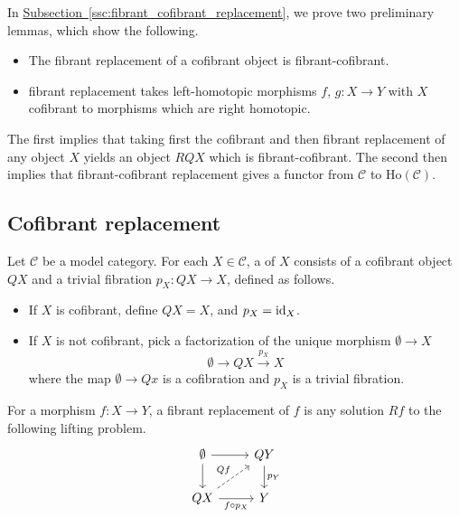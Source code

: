 \documentclass[main.tex]{subfiles}
\begin{document}
In \hyperref[ssc:fibrant_cofibrant_replacement]{Subsection~\ref*{ssc:fibrant_cofibrant_replacement}}, we prove two preliminary lemmas, which show the following.
\begin{itemize}
  \item The fibrant replacement of a cofibrant object is fibrant-cofibrant.

  \item fibrant replacement takes left-homotopic morphisms $f$, $g\colon X \to Y$ with $X$ cofibrant to morphisms which are right homotopic.
\end{itemize}
The first implies that taking first the cofibrant and then fibrant replacement of any object $X$ yields an object $RQX$ which is fibrant-cofibrant. The second then implies that fibrant-cofibrant replacement gives a functor from $\mathcal{C}$ to $\mathrm{Ho}(\mathcal{C})$.

\subsection{Cofibrant replacement}
\label{ssc:cofibrant_replacement}

\begin{definition}
  \label{def:cofibrant_replacement}
  Let $\mathcal{C}$ be a model category. For each $X \in \mathcal{C}$, a  of $X$ consists of a cofibrant object $QX$ and a trivial fibration $p_{X}\colon QX \to X$, defined as follows.
  \begin{itemize}
    \item If $X$ is cofibrant, define $QX = X$, and $p_{X} = \mathrm{id}_{X}$.

    \item If $X$ is not cofibrant, pick a factorization of the unique morphism $\emptyset \to X$
      \begin{equation*}
        \emptyset \to QX \overset{p_{X}}{\to} X
      \end{equation*}
      where the map $\emptyset \to Qx$ is a cofibration and $p_{X}$ is a trivial fibration.
  \end{itemize}

  For a morphism $f\colon X \to Y$, a fibrant replacement of $f$ is any solution $Rf$ to the following lifting problem.
  \begin{equation*}
    \begin{tikzcd}
      \emptyset
      \arrow[r]
      \arrow[d]
      & QY
      \arrow[d, "p_{Y}"]
      \\
      QX
      \arrow[r, swap, "f \circ p_{X}"]
      \arrow[ur, dashed, "Qf"]
      & Y
    \end{tikzcd}
  \end{equation*}
\end{definition}
\end{document}
